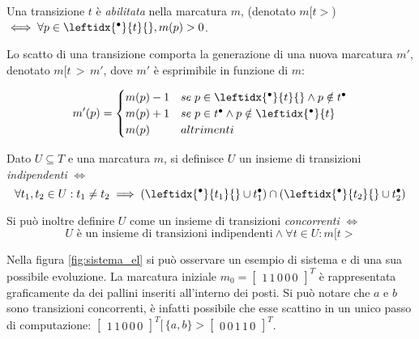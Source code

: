 \begin{definition}
\normalfont
Una transizione $t$ è \emph{abilitata} nella marcatura $m$, (denotato $m[t>$)
$\iff \forall p \in \leftidx{^\bullet}{t}{}, m(p) > 0$.

Lo scatto di una transizione comporta la generazione di una nuova marcatura $m'$,
denotato $m[t {\,>\,} m'$, dove $m'$ è esprimibile in funzione di $m$:

$$
m'(p) = \begin{cases}m(p) - 1 & se \; p \in \leftidx{^\bullet}{t}{}
\land p \notin t^{\bullet}\\
m(p) + 1 & se\; p \in t^{\bullet} 
\land p \notin \leftidx{^\bullet}{t}\\m(p) & altrimenti\end{cases}
$$

\end{definition}

\begin{definition}
\normalfont
Dato $U \subseteq T $ e una marcatura $m$, si definisce $U$ un insieme di transizioni \emph{indipendenti} $\iff$
$$
\forall t_1, t_2 \in U: t_1 \neq t_2 \implies
(\leftidx{^\bullet}{t_1}{} \cup t_1^{\bullet}) \cap 
(\leftidx{^\bullet}{t_2}{} \cup t_2^{\bullet})
$$

Si può inoltre definire $U$ come un insieme di transizioni 
\emph{concorrenti} $\iff$
$$ U \textrm{ è un insieme di transizioni indipendenti} \land \forall t
    \in U: m[t> 
$$

Nella figura \ref{fig:sistema_el} si può osservare un esempio di sistema e
di una sua possibile evoluzione. La marcatura iniziale 
$
m_0 =
\begin{bmatrix}
1 \, 1 \, 0 \, 0 \, 0
\end{bmatrix}^T
$
è rappresentata graficamente da dei pallini inseriti all'interno dei posti.
Si può notare che $a$ e $b$ sono transizioni concorrenti, è infatti
possibile che esse scattino in un unico passo di computazione:
$ 
\begin{bmatrix}
1 \, 1 \, 0 \, 0 \, 0
\end{bmatrix}^T
[\,\{a,b\}>
\begin{bmatrix}
0 \, 0 \, 1 \, 1 \, 0
\end{bmatrix}^T
$.
\end{definition}

